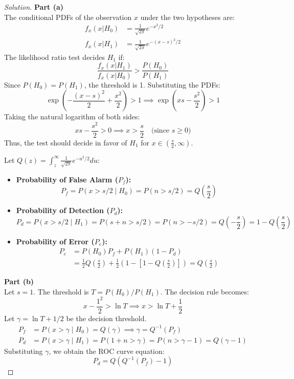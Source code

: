 \documentclass{article}
\begin{document}
\begin{proof}[Solution]
	\textbf{Part (a)}\\
	The conditional PDFs of the observation $x$ under the two hypotheses are:
	\begin{align*}
		f_x(x|H_0) &= \frac{1}{\sqrt{2\pi}} e^{-x^2/2} \\
		f_x(x|H_1) &= \frac{1}{\sqrt{2\pi}} e^{-(x-s)^2/2}
	\end{align*}
	The likelihood ratio test decides $H_1$ if:
	\[
		\frac{f_x(x|H_1)}{f_x(x|H_0)} > \frac{P(H_0)}{P(H_1)}
	\]
	Since $P(H_0) = P(H_1)$, the threshold is 1. Substituting the PDFs:
	\[
		\exp\left( -\frac{(x-s)^2}{2} + \frac{x^2}{2} \right) > 1 \implies \exp\left( xs - \frac{s^2}{2} \right) > 1
	\]
	Taking the natural logarithm of both sides:
	\[
		xs - \frac{s^2}{2} > 0 \implies x > \frac{s}{2} \quad \text{(since } s \ge 0 \text{)}
	\]
	Thus, the test should decide in favor of $H_1$ for $x \in \left(\frac{s}{2}, \infty\right)$.
	
	Let $Q(z) = \int_z^\infty \frac{1}{\sqrt{2\pi}} e^{-u^2/2} du$:
	\begin{itemize}
	    \item \textbf{Probability of False Alarm ($P_f$):} 
	    \[ P_f = P(x > s/2 \mid H_0) = P(n > s/2) = Q\left(\frac{s}{2}\right) \]
	    \item \textbf{Probability of Detection ($P_d$):} 
	    \[ P_d = P(x > s/2 \mid H_1) = P(s+n > s/2) = P(n > -s/2) = Q\left(-\frac{s}{2}\right) = 1 - Q\left(\frac{s}{2}\right) \]
	    \item \textbf{Probability of Error ($P_e$):}
	    \begin{align*}
	        P_e &= P(H_0)P_f + P(H_1)(1 - P_d) \\
	        &= \frac{1}{2}Q\left(\frac{s}{2}\right) + \frac{1}{2}\left(1 - \left[1 - Q\left(\frac{s}{2}\right)\right]\right) = Q\left(\frac{s}{2}\right)
	    \end{align*}
	\end{itemize}
	
	\vspace{0.5cm}
	\textbf{Part (b)}\\
	Let $s=1$. The threshold is $T = P(H_0)/P(H_1)$. The decision rule becomes:
	\[
		x - \frac{1^2}{2} > \ln T \implies x > \ln T + \frac{1}{2}
	\]
	Let $\gamma = \ln T + 1/2$ be the decision threshold.
	\begin{align*}
		P_f &= P(x > \gamma \mid H_0) = Q(\gamma) \implies \gamma = Q^{-1}(P_f) \\
		P_d &= P(x > \gamma \mid H_1) = P(1+n > \gamma) = P(n > \gamma - 1) = Q(\gamma - 1)
	\end{align*}
	Substituting $\gamma$, we obtain the ROC curve equation:
	\[
		P_d = Q\left(Q^{-1}(P_f) - 1\right)
	\]
	\end{proof}
\end{document}
